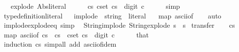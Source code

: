 \begin{isabellebody}
\ \ \ explode\ Abs{\isacharunderscore}{\kern0pt}literal\isanewline
%
\isadelimproof
%
\endisadelimproof
%
\isatagproof
{}\isamarkupfalse%
\isanewline
\ \ \isamarkupfalse%
\ {\isachardoublequoteopen}{\isacharbrackleft}{\kern0pt}{\isacharbrackright}{\kern0pt}\ {\isasymin}\ {\isacharbraceleft}{\kern0pt}cs{\isachardot}{\kern0pt}\ {\isasymforall}c{\isasymin}set\ cs{\isachardot}{\kern0pt}\ {\isasymnot}\ digit{}\ c{\isacharbraceright}{\kern0pt}{\isachardoublequoteclose}\isanewline
\ \ \ \ \isamarkupfalse%
\ simp\isanewline
{}\isamarkupfalse%
\isanewline
\isanewline
{}%
\endisatagproof
{\isafoldproof}%
%
\isadelimproof
%
\endisadelimproof
\ \isamarkupfalse%
\ type{\isacharunderscore}{\kern0pt}definition{\isacharunderscore}{\kern0pt}literal\isanewline
\isanewline
{}\ \isamarkupfalse%
\ implode\ {\isacharcolon}{\kern0pt}{\isacharcolon}{\kern0pt}\ {\isachardoublequoteopen}string\ {\isasymRightarrow}\ literal{\isachardoublequoteclose}\isanewline
\ \ \ {\isachardoublequoteopen}map\ ascii{\isacharunderscore}{\kern0pt}of{\isachardoublequoteclose}\isanewline
%
\isadelimproof
\ \ %
\endisadelimproof
%
\isatagproof
{}\isamarkupfalse%
\ auto\isanewline
\isanewline
{}%
\endisatagproof
{\isafoldproof}%
%
\isadelimproof
%
\endisadelimproof
\ \isamarkupfalse%
\ implode{\isacharunderscore}{\kern0pt}explode{\isacharunderscore}{\kern0pt}eq\ {\isacharbrackleft}{\kern0pt}simp{\isacharbrackright}{\kern0pt}{\isacharcolon}{\kern0pt}\isanewline
\ \ {\isachardoublequoteopen}String{\isachardot}{\kern0pt}implode\ {\isacharparenleft}{\kern0pt}String{\isachardot}{\kern0pt}explode\ s{\isacharparenright}{\kern0pt}\ {\isacharequal}{\kern0pt}\ s{\isachardoublequoteclose}\isanewline
%
\isadelimproof
%
\endisadelimproof
%
\isatagproof
{}\isamarkupfalse%
\ transfer\isanewline
\ \ \isamarkupfalse%
\ cs\isanewline
\ \ \isamarkupfalse%
\ {\isachardoublequoteopen}map\ ascii{\isacharunderscore}{\kern0pt}of\ cs\ {\isacharequal}{\kern0pt}\ cs{\isachardoublequoteclose}\ \ {\isachardoublequoteopen}{\isasymforall}c{\isasymin}set\ cs{\isachardot}{\kern0pt}\ {\isasymnot}\ digit{}\ c{\isachardoublequoteclose}\isanewline
\ \ \ \ \isamarkupfalse%
\ that\isanewline
\ \ \ \ \ \ \isamarkupfalse%
\ {\isacharparenleft}{\kern0pt}induction\ cs{\isacharparenright}{\kern0pt}\ {\isacharparenleft}{\kern0pt}simp{\isacharunderscore}{\kern0pt}all\ add{\isacharcolon}{\kern0pt}\ ascii{\isacharunderscore}{\kern0pt}of{\isacharunderscore}{\kern0pt}idem{\isacharparenright}{\kern0pt}\isanewline

\end{isabellebody}
